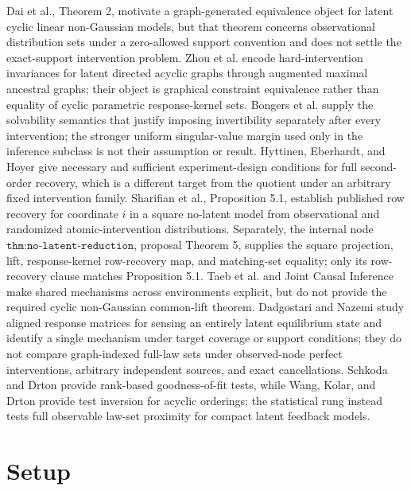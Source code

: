 \documentclass{article}
\begin{document}
Dai et al., Theorem 2, motivate a graph-generated equivalence object for latent cyclic linear non-Gaussian models, but that theorem concerns observational distribution sets under a zero-allowed support convention and does not settle the exact-support intervention problem. Zhou et al. encode hard-intervention invariances for latent directed acyclic graphs through augmented maximal ancestral graphs; their object is graphical constraint equivalence rather than equality of cyclic parametric response-kernel sets. Bongers et al. supply the solvability semantics that justify imposing invertibility separately after every intervention; the stronger uniform singular-value margin used only in the inference subclass is not their assumption or result. Hyttinen, Eberhardt, and Hoyer give necessary and sufficient experiment-design conditions for full second-order recovery, which is a different target from the quotient under an arbitrary fixed intervention family. Sharifian et al., Proposition 5.1, establish published row recovery for coordinate \(i\) in a square no-latent model from observational and randomized atomic-intervention distributions. Separately, the internal node \(\texttt{thm:no-latent-reduction}\), proposal Theorem 5, supplies the square projection, lift, response-kernel row-recovery map, and matching-set equality; only its row-recovery clause matches Proposition 5.1. Taeb et al. and Joint Causal Inference make shared mechanisms across environments explicit, but do not provide the required cyclic non-Gaussian common-lift theorem. Dadgostari and Nazemi study aligned response matrices for sensing an entirely latent equilibrium state and identify a single mechanism under target coverage or support conditions; they do not compare graph-indexed full-law sets under observed-node perfect interventions, arbitrary independent sources, and exact cancellations. Schkoda and Drton provide rank-based goodness-of-fit tests, while Wang, Kolar, and Drton provide test inversion for acyclic orderings; the statistical rung instead tests full observable law-set proximity for compact latent feedback models.

\section{Setup}
\end{document}
